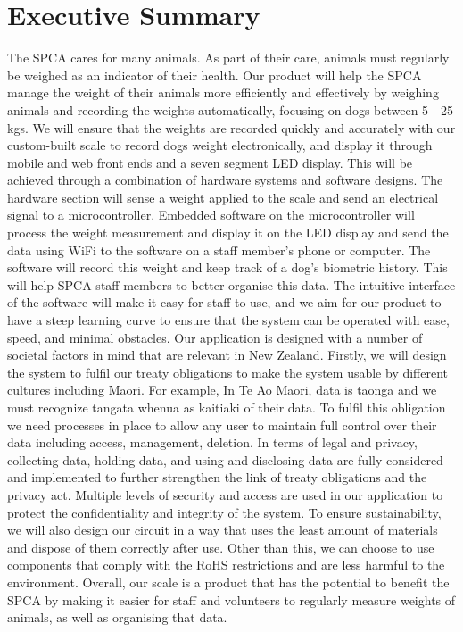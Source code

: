 
\chapter{Executive Summary}

The SPCA cares for many animals. As part of their care, animals must regularly be weighed as an indicator of their health. Our product will help the SPCA manage the weight of their animals more efficiently and effectively by weighing animals and recording the weights automatically, focusing on dogs between 5 - 25 kgs. We will ensure that the weights are recorded quickly and accurately with our custom-built scale to record dogs weight electronically, and display it through mobile and web front ends and a seven segment LED display. This will be achieved through a combination of hardware systems and software designs. The hardware section will sense a weight applied to the scale and send an electrical signal to a microcontroller. Embedded software on the microcontroller will process the weight measurement and display it on the LED display and send the data using WiFi to the software on a staff member’s phone or computer. The software will record this weight and keep track of a dog’s biometric history. This will help SPCA staff members to better organise this data. The intuitive interface of the software will make it easy for staff to use, and we aim for our product to have a steep learning curve to ensure that the system can be operated with ease, speed, and minimal obstacles. 
Our application is designed with a number of societal factors in mind that are relevant in New Zealand. Firstly, we will design the system to fulfil our treaty obligations to make the system usable by different cultures including Māori. For example, In Te Ao Māori, data is taonga and we must recognize tangata whenua as kaitiaki of their data. To fulfil this obligation we need processes in place to allow any user to maintain full control over their data including access, management, deletion. In terms of legal and privacy, collecting data, holding data, and using and disclosing data are fully considered and implemented to further strengthen the link of treaty obligations and the privacy act. Multiple levels of security and access are used in our application to protect the confidentiality and integrity of the system. To ensure sustainability, we will also design our circuit in a way that uses the least amount of materials and dispose of them correctly after use. Other than this, we can choose to use components that comply with the RoHS restrictions and are less harmful to the environment.
Overall, our scale is a product that has the potential to benefit the SPCA by making it easier  for staff and volunteers to regularly measure weights of animals, as well as organising that data. 
